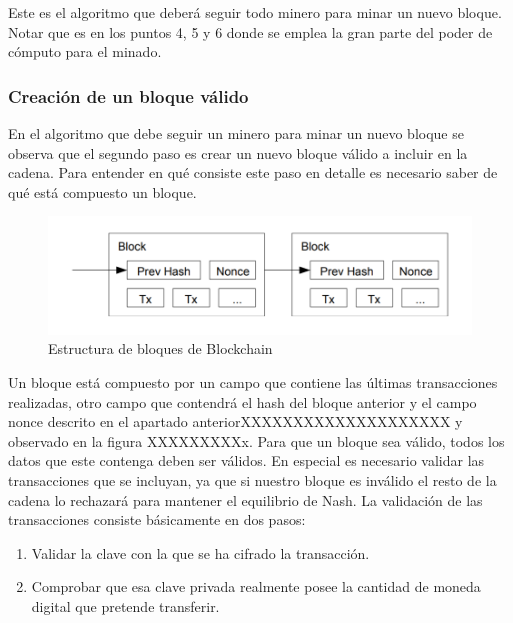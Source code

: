 Este es el algoritmo que deberá seguir todo minero para minar un nuevo bloque. Notar que es en los puntos 4, 5 y 6 donde se emplea la gran parte del poder de cómputo para el minado.

\subsubsection{Creación de un bloque válido}
En el algoritmo que debe seguir un minero para minar un nuevo bloque se observa que el segundo paso es crear un nuevo bloque válido a incluir en la cadena. Para entender en qué consiste este paso en detalle es necesario saber de qué está compuesto un bloque.\newline 

\begin{figure}
	\centering
	\includegraphics[width=1\textwidth]{imagenes/bloque.PNG}
	\caption{\label{fig1}Estructura de bloques de Blockchain \cite{bitcoin}}
\end{figure}

Un bloque está compuesto por un campo que contiene las últimas transacciones realizadas, otro campo que contendrá el hash del bloque anterior y el campo nonce descrito en el apartado anteriorXXXXXXXXXXXXXXXXXXXX y observado en la figura XXXXXXXXXx. Para que un bloque sea válido, todos los datos que este contenga deben ser válidos. En especial es necesario validar las transacciones que se incluyan, ya que si nuestro bloque es inválido el resto de la cadena lo rechazará para mantener el equilibrio de Nash.
La validación de las transacciones consiste básicamente en dos pasos:

\begin{enumerate}
	\item Validar la clave con la que se ha cifrado la transacción.
	\item Comprobar que esa clave privada realmente posee la cantidad de moneda digital que pretende transferir.
\end{enumerate}

